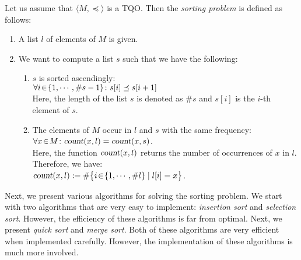 Let us assume that $\langle M, \preceq \rangle$ is a  \textsc{TQO}.  Then the \emph{sorting problem}
is defined as follows:
\begin{enumerate}
\item A list $l$ of elements of $M$ is given.
\item We want to compute a list $s$ such that we have the following: 
  \begin{enumerate}
  \item $s$ is sorted ascendingly: \\[0.2cm]
        \hspace*{1.3cm} 
        $\forall i \!\in\! \{ 1, \cdots, \#s-1 \} \colon s[i] \preceq s[i+1]$ 
        \\[0.2cm]
        Here, the length of the list $s$ is denoted as $\#s$ and $s[i]$ is the $i$-th element of $s$.
  \item The elements of $M$ occur in $l$ and $s$ with the same frequency: \\[0.2cm]
        \hspace*{1.3cm} 
        $\forall x\!\in\! M \colon \textsl{count}(x,l) = \textsl{count}(x,s)$.
        \\[0.2cm]
        Here, the function $\textsl{count}(x,l)$ returns the number of occurrences of $x$ in $l$.
        Therefore, we have: \\[0.2cm]
        \hspace*{1.3cm}
        $\textsl{count}(x,l) := \# \bigl\{ i \!\in\! \{1,\cdots,\#l\} \mid l[i] = x \bigr\}$.
  \end{enumerate}
\end{enumerate}
Next, we present various algorithms for solving the sorting problem.  We start with two algorithms
that are very easy to implement: \emph{insertion sort} and \emph{selection sort}.  However, the
efficiency of these algorithms is far from optimal.  Next, we present \emph{quick sort} and 
\emph{merge sort}.  Both of these algorithms are very efficient when implemented carefully.
However, the implementation of these algorithms is much more involved.


